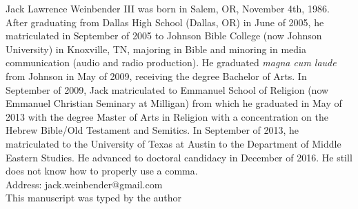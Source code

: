 
Jack Lawrence Weinbender III was born in Salem, OR, November 4th, 1986. After graduating from Dallas High School (Dallas, OR) in June of 2005, he matriculated in September of 2005 to Johnson Bible College (now Johnson University) in Knoxville, TN, majoring in Bible and minoring in media communication (audio and radio production). He graduated \emph{magna cum laude} from Johnson in May of 2009, receiving the degree Bachelor of Arts. In September of 2009, Jack matriculated to Emmanuel School of Religion (now Emmanuel Christian Seminary at Milligan) from which he graduated in May of 2013 with the degree Master of Arts in Religion with a concentration on the Hebrew Bible/Old Testament and Semitics. In September of 2013, he matriculated to the University of Texas at Austin to the Department of Middle Eastern Studies. He advanced to doctoral candidacy in December of 2016. He still does not know how to properly use a comma.\\[36pt]


\noindent
Address: jack.weinbender@gmail.com\\[24pt]

\noindent
This manuscript was typed by the author